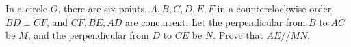 In a circle $O$, there are six points, $A,B,C,D,E, F$ in a counterclockwise order. $BD \perp CF$, and $CF,BE,AD$ are concurrent. Let the perpendicular from $B$ to $AC$ be $M$, and the perpendicular from $D$ to $CE$ be $N$. Prove that $AE // MN$.